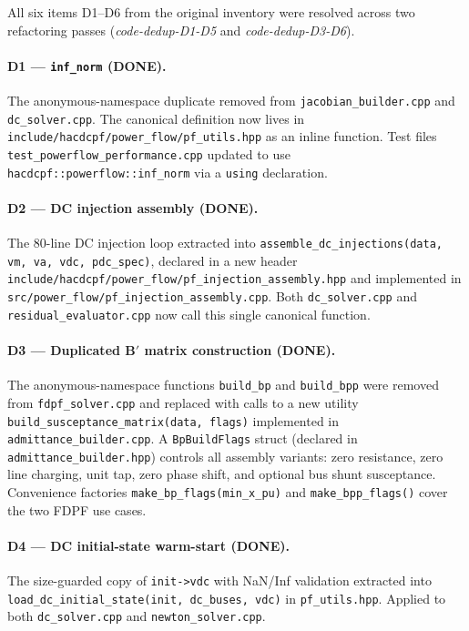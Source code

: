 All six items D1--D6 from the original inventory were resolved across two
refactoring passes (\textit{code-dedup-D1-D5} and \textit{code-dedup-D3-D6}).

\paragraph{D1 --- \texttt{inf\_norm} \textnormal{(}\textbf{DONE}\textnormal{)}.}
The anonymous-namespace duplicate removed from
\texttt{jacobian\_builder.cpp} and \texttt{dc\_solver.cpp}.
The canonical definition now lives in
\texttt{include/hacdcpf/power_flow/pf\_utils.hpp} as an inline function.
Test files \texttt{test\_powerflow\_performance.cpp} updated to use
\texttt{hacdcpf::powerflow::inf\_norm} via a \texttt{using} declaration.

\paragraph{D2 --- DC injection assembly \textnormal{(}\textbf{DONE}\textnormal{)}.}
The 80-line DC injection loop extracted into
\texttt{assemble\_dc\_injections(data, vm, va, vdc, pdc\_spec)},
declared in a new header
\texttt{include/hacdcpf/power_flow/pf\_injection\_assembly.hpp} and
implemented in \texttt{src/power_flow/pf\_injection\_assembly.cpp}.
Both \texttt{dc\_solver.cpp} and \texttt{residual\_evaluator.cpp} now
call this single canonical function.

\paragraph{D3 --- Duplicated B\('\) matrix construction \textnormal{(}\textbf{DONE}\textnormal{)}.}
The anonymous-namespace functions \texttt{build\_bp} and \texttt{build\_bpp}
were removed from \texttt{fdpf\_solver.cpp} and replaced with calls to a
new utility \texttt{build\_susceptance\_matrix(data, flags)} implemented in
\texttt{admittance\_builder.cpp}.  A \texttt{BpBuildFlags} struct (declared in
\texttt{admittance\_builder.hpp}) controls all assembly variants: zero
resistance, zero line charging, unit tap, zero phase shift, and optional bus
shunt susceptance.  Convenience factories \texttt{make\_bp\_flags(min\_x\_pu)}
and \texttt{make\_bpp\_flags()} cover the two FDPF use cases.

\paragraph{D4 --- DC initial-state warm-start \textnormal{(}\textbf{DONE}\textnormal{)}.}
The size-guarded copy of \texttt{init->vdc} with NaN/Inf validation
extracted into \texttt{load\_dc\_initial\_state(init, dc\_buses, vdc)}
in \texttt{pf\_utils.hpp}.  Applied to both \texttt{dc\_solver.cpp} and
\texttt{newton\_solver.cpp}.

